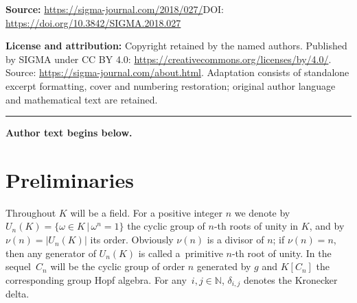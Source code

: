 \documentclass[11pt]{article}
\numberwithin{equation}{section}
\begin{document}
\noindent\textbf{Source:} \url{https://sigma-journal.com/2018/027/}\quad DOI: \url{https://doi.org/10.3842/SIGMA.2018.027}\par
\noindent\textbf{License and attribution:} Copyright retained by the named authors. Published by SIGMA under CC BY 4.0: \url{https://creativecommons.org/licenses/by/4.0/}. Source: \url{https://sigma-journal.com/about.html}. Adaptation consists of standalone excerpt formatting, cover and numbering restoration; original author language and mathematical text are retained.\par
\medskip\hrule\medskip\noindent\textbf{Author text begins below.}\par
\setcounter{section}{1}
\setcounter{subsection}{0}
\setcounter{subsubsection}{0}
\setcounter{Theorem}{0}
\setcounter{equation}{0}
\section{Preliminaries}\label{prel}
Throughout $K$ will be a field. For a positive integer $n$ we denote by $U_n (K) = \{ \omega \in K \,|\, \omega^n = 1\}$ the cyclic group of $n$-th roots of unity in $K$, and by $\nu (n) = |U_n (K)|$ its order. Obviously $\nu (n)$ is a divisor of $n$; if $\nu (n) = n$, then any generator of $U_n (K)$ is called a~primitive $n$-th root of unity. In the sequel~$C_{n}$ will be the cyclic group of order $n$ generated by $g$ and $K[C_{n}]$ the corresponding group Hopf algebra. For any~$i,j \in \mathbb{N}$, $\delta_{i, j}$ denotes the Kronecker delta.
\end{document}
